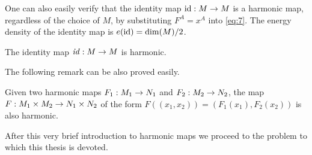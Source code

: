 One can also easily verify that the identity map $\text{id}:M\rightarrow M$ is a
harmonic map, regardless of the choice of $M$, by substituting
$F^A=x^A$ into \eqref{eq:7}. The energy density of the identity map
is $e(\text{id})=\dim(M)/2$.\\

\begin{remark}\label{rem:1}
  The identity map $\text{\emph{id}}:M\rightarrow M$ is harmonic.
\end{remark}

The following remark can be also proved easily.

\begin{remark}\label{rem:2}
  Given two harmonic maps $F_1:M_1\rightarrow N_1$ and $F_2:M_2\rightarrow N_2$, the
  map $F:M_1\times M_2\rightarrow N_1\times N_2$ of the form
  $F((x_1,x_2))=(F_1(x_1),F_2(x_2))$ is also harmonic.
\end{remark}

After this very brief introduction to harmonic maps we proceed to the
problem to which this thesis is devoted.


